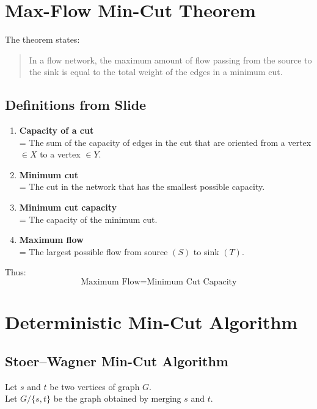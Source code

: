 \documentclass[12pt]{article}
\begin{document}
\section{Max-Flow Min-Cut Theorem}

The theorem states:

\begin{quote}
In a flow network, the maximum amount of flow passing from the source to the sink is equal to the total weight of the edges in a minimum cut.
\end{quote}

\subsection*{Definitions from Slide}

\begin{enumerate}
    \item \textbf{Capacity of a cut} \\
    = The sum of the capacity of edges in the cut that are oriented from a vertex $\in X$ to a vertex $\in Y$.

    \item \textbf{Minimum cut} \\
    = The cut in the network that has the smallest possible capacity.

    \item \textbf{Minimum cut capacity} \\
    = The capacity of the minimum cut.

    \item \textbf{Maximum flow} \\
    = The largest possible flow from source $(S)$ to sink $(T)$.
\end{enumerate}

Thus:
\[
\text{Maximum Flow} = \text{Minimum Cut Capacity}
\]

\section{Deterministic Min-Cut Algorithm}

\subsection{Stoer--Wagner Min-Cut Algorithm}

Let $s$ and $t$ be two vertices of graph $G$. \\
Let $G/\{s,t\}$ be the graph obtained by merging $s$ and $t$.
\end{document}
